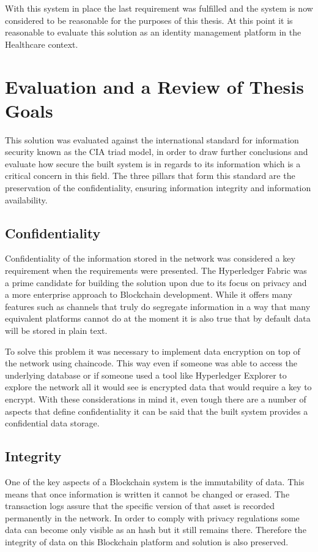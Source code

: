 With this system in place the last requirement was fulfilled and the system is
now considered to be reasonable for the purposes of this thesis. At this point
it is reasonable to evaluate this solution as an identity management platform
in the Healthcare context.

\section{Evaluation and a Review of Thesis Goals}

This solution was evaluated against the international standard for information
security known as the CIA triad model, in order to draw further conclusions and
evaluate how secure the built system is in regards to its information which is
a critical concern in this field. The three pillars that form this standard are
the preservation of the confidentiality, ensuring information integrity and
information availability.

\subsection{Confidentiality}

Confidentiality of the information stored in the network was considered a key
requirement when the requirements were presented. The Hyperledger Fabric was a
prime candidate for building the solution upon due to its focus on privacy and
a more enterprise approach to Blockchain development. While it offers many
features such as channels that truly do segregate information in a way that
many equivalent platforms cannot do at the moment it is also true that by
default data will be stored in plain text. 

To solve this problem it was necessary to implement data encryption on top of
the network using chaincode. This way even if someone was able to access the
underlying database or if someone used a tool like Hyperledger Explorer to
explore the network all it would see is encrypted data that would require a key
to encrypt. With these considerations in mind it, even tough there are a number
of aspects that define confidentiality it can be said that the built system
provides a confidential data storage.

\subsection{Integrity}

One of the key aspects of a Blockchain system is the immutability of data. This
means that once information is written it cannot be changed or erased. The
transaction logs assure that the specific version of that asset is recorded
permanently in the network. In order to comply with privacy regulations some
data can become only visible as an hash but it still remains there. Therefore
the integrity of data on this Blockchain platform and solution is also
preserved.

